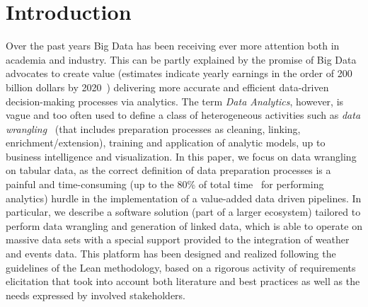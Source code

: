 \section{Introduction}



Over the past years Big Data has been receiving ever more attention both in academia and industry. 
This can be partly explained by the promise of Big Data advocates to create value (estimates indicate yearly earnings in the order of 200 billion dollars by 2020~\cite{idc_analytics}) delivering more accurate and efficient data-driven decision-making processes via analytics. 
The term \textit{Data Analytics}, however, is vague and too often used to define a class of heterogeneous activities such as \textit{data wrangling}~\cite{furche2016data} (that includes preparation processes as cleaning, linking, enrichment/extension), training and application of analytic models, up to business intelligence and visualization. 
In this paper, we focus on data wrangling on tabular data, as the correct definition of data preparation processes is a painful and time-consuming (up to the 80\% of total time~\cite{lohr2014big} for performing analytics) hurdle in the implementation of a value-added data driven pipelines.
In particular, we describe a software solution (part of a larger ecosystem) tailored to perform data wrangling and generation of linked data, which is able to operate on massive data sets with a special support provided to the integration of weather and events data. This platform has been designed and realized following the guidelines of the Lean methodology, based on a rigorous activity of requirements elicitation that took into account both literature and best practices as well as the needs expressed by involved stakeholders. 



